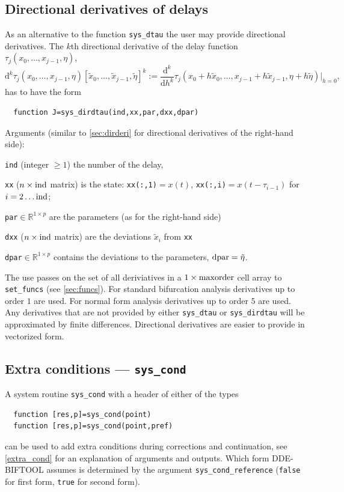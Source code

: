 \documentclass[10pt]{scrartcl}
\newcommand{\DDEBIFCODE}{\textsc{DDE-BIFTOOL}}
\renewcommand{\d}{\mathrm{d}}
\newcommand{\RR}{\mathbb{R}}
\newcommand{\blist}[1]{\mbox{\lstinline!#1!}}
\begin{document}
\subsection{Directional derivatives of delays}
\label{sec:dirdtau}
As an alternative to the function \blist{sys_dtau} the user may
provide directional derivatives. The $k$th directional derivative of
the delay function $\tau_j(x_0,\ldots,x_{j-1},\eta)$,
\begin{displaymath}
  \d^k\tau_j(x_0,\ldots,x_{j-1},\eta)[\tilde{x}_0,\ldots,\tilde{x}_{j-1},\tilde{\eta}]^k:=
  \frac{\d^k}{\d h^k}\tau_j(x_0+h\tilde{x}_0,\ldots,x_{j-1}+h\tilde{x}_{j-1},\eta+h\tilde{\eta})\vert_{h=0}\mbox{,}
\end{displaymath}
 has to have the form
\begin{lstlisting}
  function J=sys_dirdtau(ind,xx,par,dxx,dpar)
\end{lstlisting}
Arguments (similar to \cref{sec:dirderi} for directional derivatives of the right-hand side):
\begin{compactitem}
\item \blist{ind} (integer $\geq1$) the number of the delay,
\item \blist{xx} ($n\times\blist{ind}$ matrix) is the state:
  \blist{xx(:,1)}$=x(t)$, \blist{xx(:,i)}$=x(t-\tau_{i-1})$ for
  $i=2\ldots\blist{ind}$;
\item \blist{par}$\in\RR^{1\times p}$ are the parameters (as for the right-hand side)
\item \blist{dxx} ($n\times\blist{ind}$ matrix) are the deviations $\tilde{x}_i$ from \blist{xx}
\item \blist{dpar}$\in\RR^{1\times
  p}$ contains the deviations to the parameters, $\blist{dpar}=\tilde{\eta}$.
\end{compactitem}
The use passes on the set of all deriviatives in a
$1\times\blist{maxorder}$ cell array to \blist{set_funcs} (see
\cref{sec:funcs}). For standard bifurcation analysis derivatives up to
order $1$ are used. For normal form analysis derivatives up to order
$5$ are used. Any derivatives that are not provided by either
\blist{sys_dtau} or \blist{sys_dirdtau} will be approximated by finite
differences.  Directional derivatives are easier to provide in vectorized form.

\subsection{Extra conditions --- \texorpdfstring{\blist{sys_cond}}{sys\_cond}}\label{sec:syscond}
A system routine \blist{sys_cond} with a header of either of the types
\begin{lstlisting}
  function [res,p]=sys_cond(point)
  function [res,p]=sys_cond(point,pref)
\end{lstlisting}
can be used to add extra conditions during corrections and
continuation, see \cref{extra_cond} for an explanation of
arguments and outputs. Which form \DDEBIFCODE{} assumes is determined
by the argument \blist{sys_cond_reference} (\blist{false} for first
form, \blist{true} for second form).
\end{document}
